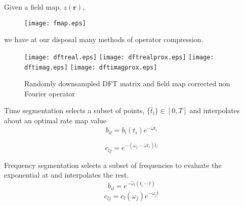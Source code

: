 \documentclass[xcolor=dvipsnames]{beamer}
\theoremstyle{remark}
\begin{document}
\begin{frame}

Given a field map, $z(\mathbf{r})$,
\begin{center}
\begin{figure}
\texttt{[image: fmap.eps]}
\end{figure}
\end{center}
we have at our disposal many methods of operator compression.

\end{frame}
\begin{frame}

\begin{center}
\begin{figure}
\texttt{[image: dftreal.eps]}
\texttt{[image: dftrealprox.eps]}
\linebreak
\texttt{[image: dftimag.eps]}
\texttt{[image: dftimagprox.eps]}
\caption{Randomly downsampled DFT matrix and field map corrected non Fourier operator}
\end{figure}
\end{center}

\end{frame}


\begin{frame}

Time segmentation \cite{Sutton2003} selects a subset of points, $\{ \hat{t}_l \} \in [0,T]$ and interpolates about an optimal rate map value
\begin{equation}
b_{il} = b_l(t_i)e^{-\overline{\omega}t_i}
\end{equation}

\begin{equation}
c_{lj} = e^{-(\omega_j - \overline{\omega}t_i)\hat{t}_l}
\end{equation}

\end{frame}

\begin{frame}

Frequency segmentation \cite{Man} selects a subset of frequencies to evaluate the exponential at and interpolates the rest.
\begin{equation}
b_{il} = e^{-\hat{\omega}_l(t_i - \overline{t})}
\end{equation}
\begin{equation}
c_{lj} = c_l(\omega_j) e^{-\omega_j\overline{t}}
\end{equation}

\end{frame}
\end{document}
